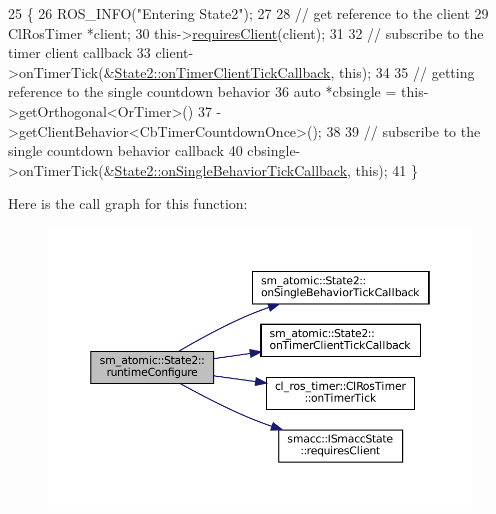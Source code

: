\begin{DoxyCode}
25     \{
26         ROS\_INFO(\textcolor{stringliteral}{"Entering State2"});
27 
28         \textcolor{comment}{// get reference to the client}
29         ClRosTimer *client;
30         this->\hyperlink{classsmacc_1_1ISmaccState_a7f95c9f0a6ea2d6f18d1aec0519de4ac}{requiresClient}(client);
31 
32         \textcolor{comment}{// subscribe to the timer client callback}
33         client->onTimerTick(&\hyperlink{structsm__atomic_1_1State2_ab265295bfddde63b2dcf5f97bfc44e48}{State2::onTimerClientTickCallback}, \textcolor{keyword}{this});
34 
35          \textcolor{comment}{// getting reference to the single countdown behavior}
36         \textcolor{keyword}{auto} *cbsingle = this->getOrthogonal<OrTimer>()
37                              ->getClientBehavior<CbTimerCountdownOnce>();
38 
39         \textcolor{comment}{// subscribe to the single countdown behavior callback}
40         cbsingle->onTimerTick(&\hyperlink{structsm__atomic_1_1State2_a871fb6c688a61bb4902ea6d44f51025c}{State2::onSingleBehaviorTickCallback}, \textcolor{keyword}{
      this});
41     \}
\end{DoxyCode}
Here is the call graph for this function\+:
\nopagebreak
\begin{figure}[H]
\begin{center}
\leavevmode
\includegraphics[width=350pt]{structsm__atomic_1_1State2_afd749890e13d8aa36f1ac6645a5f7f9a_cgraph}
\end{center}
\end{figure}
\mbox{\label{structsm__atomic_1_1State2_ab6cafa3e8433c2d7ee10fa6fec8f3748}} 
